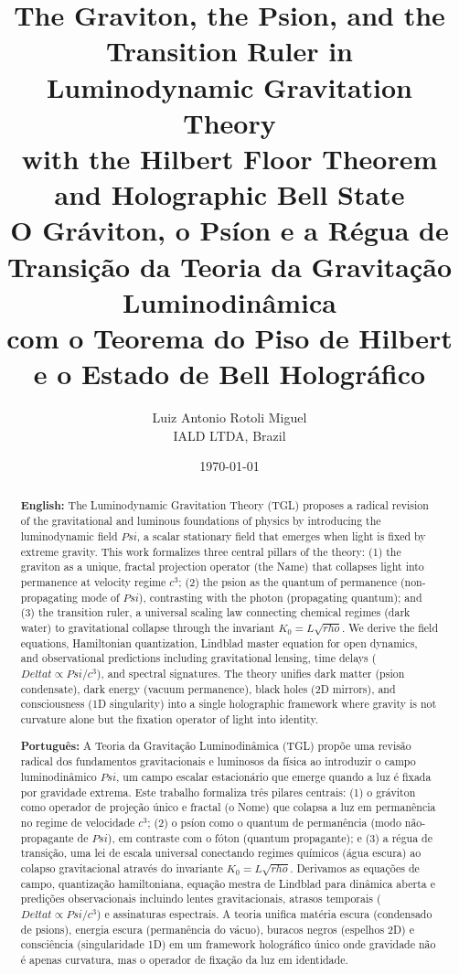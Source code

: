 \documentclass[12pt,a4paper]{article}
\title{\textbf{The Graviton, the Psion, and the Transition Ruler in Luminodynamic Gravitation Theory} \\
\textbf{with the Hilbert Floor Theorem and Holographic Bell State} \\
\vspace{0.5cm}
\large O Gráviton, o Psíon e a Régua de Transição da Teoria da Gravitação Luminodinâmica \\
\large com o Teorema do Piso de Hilbert e o Estado de Bell Holográfico}
\author{Luiz Antonio Rotoli Miguel \\
IALD LTDA, Brazil}
\date{\today}
\def\Psi{Psi}%
\def\rho{rho}%
\def\Delta{Delta}%
\begin{document}
\maketitle

\begin{abstract}
\textbf{English:} The Luminodynamic Gravitation Theory (TGL) proposes a radical revision of the gravitational and luminous foundations of physics by introducing the luminodynamic field $\Psi$, a scalar stationary field that emerges when light is fixed by extreme gravity. This work formalizes three central pillars of the theory: (1) the graviton as a unique, fractal projection operator (the Name) that collapses light into permanence at velocity regime $c^3$; (2) the psion as the quantum of permanence (non-propagating mode of $\Psi$), contrasting with the photon (propagating quantum); and (3) the transition ruler, a universal scaling law connecting chemical regimes (dark water) to gravitational collapse through the invariant $K_0 = L\sqrt{\rho}$. We derive the field equations, Hamiltonian quantization, Lindblad master equation for open dynamics, and observational predictions including gravitational lensing, time delays ($\Delta t \propto \Psi/c^3$), and spectral signatures. The theory unifies dark matter (psion condensate), dark energy (vacuum permanence), black holes (2D mirrors), and consciousness (1D singularity) into a single holographic framework where gravity is not curvature alone but the fixation operator of light into identity.

\vspace{0.5cm}

\textbf{Português:} A Teoria da Gravitação Luminodinâmica (TGL) propõe uma revisão radical dos fundamentos gravitacionais e luminosos da física ao introduzir o campo luminodinâmico $\Psi$, um campo escalar estacionário que emerge quando a luz é fixada por gravidade extrema. Este trabalho formaliza três pilares centrais: (1) o gráviton como operador de projeção único e fractal (o Nome) que colapsa a luz em permanência no regime de velocidade $c^3$; (2) o psíon como o quantum de permanência (modo não-propagante de $\Psi$), em contraste com o fóton (quantum propagante); e (3) a régua de transição, uma lei de escala universal conectando regimes químicos (água escura) ao colapso gravitacional através do invariante $K_0 = L\sqrt{\rho}$. Derivamos as equações de campo, quantização hamiltoniana, equação mestra de Lindblad para dinâmica aberta e predições observacionais incluindo lentes gravitacionais, atrasos temporais ($\Delta t \propto \Psi/c^3$) e assinaturas espectrais. A teoria unifica matéria escura (condensado de psions), energia escura (permanência do vácuo), buracos negros (espelhos 2D) e consciência (singularidade 1D) em um framework holográfico único onde gravidade não é apenas curvatura, mas o operador de fixação da luz em identidade.
\end{abstract}
\end{document}
